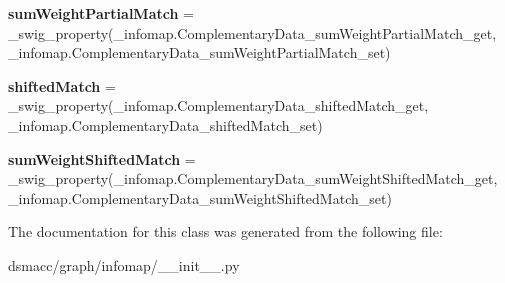\begin{DoxyCompactItemize}
\item 
\mbox{\label{classdsmacc_1_1graph_1_1infomap_1_1ComplementaryData_a18eed3d9f9e4cb6718ef95e3563d3a63}} 
{\bfseries sum\+Weight\+Partial\+Match} = \+\_\+swig\+\_\+property(\+\_\+infomap.\+Complementary\+Data\+\_\+sum\+Weight\+Partial\+Match\+\_\+get, \+\_\+infomap.\+Complementary\+Data\+\_\+sum\+Weight\+Partial\+Match\+\_\+set)
\item 
\mbox{\label{classdsmacc_1_1graph_1_1infomap_1_1ComplementaryData_a95bf176903245c0afbe414631a5cdb2a}} 
{\bfseries shifted\+Match} = \+\_\+swig\+\_\+property(\+\_\+infomap.\+Complementary\+Data\+\_\+shifted\+Match\+\_\+get, \+\_\+infomap.\+Complementary\+Data\+\_\+shifted\+Match\+\_\+set)
\item 
\mbox{\label{classdsmacc_1_1graph_1_1infomap_1_1ComplementaryData_a2b57a316c564a6c143c9499da06c67e1}} 
{\bfseries sum\+Weight\+Shifted\+Match} = \+\_\+swig\+\_\+property(\+\_\+infomap.\+Complementary\+Data\+\_\+sum\+Weight\+Shifted\+Match\+\_\+get, \+\_\+infomap.\+Complementary\+Data\+\_\+sum\+Weight\+Shifted\+Match\+\_\+set)
\end{DoxyCompactItemize}


The documentation for this class was generated from the following file\+:\begin{DoxyCompactItemize}
\item 
dsmacc/graph/infomap/\+\_\+\+\_\+init\+\_\+\+\_\+.\+py\end{DoxyCompactItemize}
